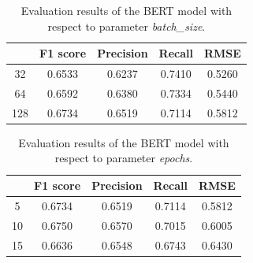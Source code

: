 \documentclass[11pt,a4paper]{article}
\begin{document}
\begin{table}[h]
\centering
\begin{tabular}{ccccc}
    & F1 score & Precision & Recall & RMSE   \\ \hline
32  & 0.6533   & 0.6237    & 0.7410 & 0.5260 \\
64  & 0.6592   & 0.6380    & 0.7334 & 0.5440 \\
128 & 0.6734   & 0.6519    & 0.7114 & 0.5812
\end{tabular}
\caption{Evaluation results of the BERT model with respect to parameter \textit{batch\_size}.}
\label{tab:bert-results-5}
\end{table}

\begin{table}[h]
\centering
\begin{tabular}{ccccc}
   & F1 score & Precision & Recall & RMSE   \\ \hline
5  & 0.6734   & 0.6519    & 0.7114 & 0.5812 \\
10 & 0.6750   & 0.6570    & 0.7015 & 0.6005 \\
15 & 0.6636   & 0.6548    & 0.6743 & 0.6430
\end{tabular}
\caption{Evaluation results of the BERT model with respect to parameter \textit{epochs}.}
\label{tab:bert-results-6}
\end{table}
\end{document}
